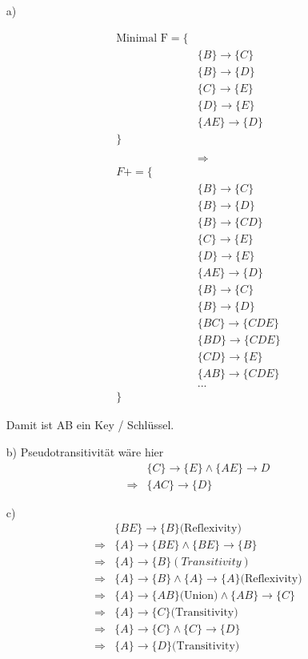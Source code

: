 \begin{itemize}

\item[a)]

\begin{align*}
\text{Minimal F} = \{ & \\
& \{B\} \rightarrow \{C\} \\
& \{B\} \rightarrow \{D\} \\
& \{C\} \rightarrow \{E\} \\
& \{D\} \rightarrow \{E\} \\
& \{AE\} \rightarrow \{D\} \\
\} & \\ \\
& \Rightarrow \\
F+ = \{ & \\
& \{B\} \rightarrow \{C\} \\
& \{B\} \rightarrow \{D\} \\
& \{B\} \rightarrow \{CD\} \\
& \{C\} \rightarrow \{E\} \\
& \{D\} \rightarrow \{E\} \\
& \{AE\} \rightarrow \{D\} \\
& \{B\} \rightarrow \{C\} \\
& \{B\} \rightarrow \{D\} \\
& \{BC\} \rightarrow \{CDE\} \\
& \{BD\} \rightarrow \{CDE\} \\
& \{CD\} \rightarrow \{E\} \\
& \{AB\} \rightarrow \{CDE\} \\
& ... \\
\} &
\end{align*}

Damit ist AB ein Key / Schlüssel.

\item[b)]
Pseudotransitivität wäre hier
\begin{align*}
& \{C\} \rightarrow \{E\} \land \{AE\} \rightarrow D \\
\Rightarrow & \{AC\} \rightarrow \{D\}
\end{align*}

\item[c)]
\begin{align*}
& \{BE\} \rightarrow \{B\} \text{(Reflexivity)} \\
\Rightarrow & \{A\} \rightarrow \{BE\} \land \{BE\} \rightarrow \{B\} \\
\Rightarrow & \{A\} \rightarrow \{B\} (Transitivity) \\
\Rightarrow & \{A\} \rightarrow \{B\} \land \{A\} \rightarrow \{A\} \text{(Reflexivity)} \\
\Rightarrow & \{A\} \rightarrow \{AB\} \text{(Union)} \land \{AB\} \rightarrow \{C\} \\
\Rightarrow & \{A\} \rightarrow \{C\} \text{(Transitivity)} \\
\Rightarrow & \{A\} \rightarrow \{C\} \land \{C\} \rightarrow \{D\} \\
\Rightarrow & \{A\} \rightarrow \{D\} \text{(Transitivity)}
\end{align*}


\end{itemize}
